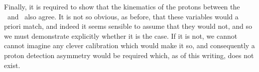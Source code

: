 Finally, it is required to show that the kinematics of the protons between the 
\pKK\ and \ppipi\ also agree.
It is not so obvious, as before, that these variables would a priori match, and 
indeed it seems sensible to assume that they would not, and so we must 
demonstrate explicitly whether it is the case.
If it is not, we cannot cannot imagine any clever calibration which would make 
it so, and consequently a proton detection asymmetry would be required which, 
as of this writing, does not exist.\footnotemark

